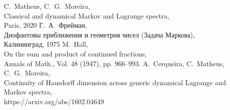 \begin{thebibliography}{3}
	C.~Matheus, C.~G.~Moreira,\\
	Classical and dynamical Markov and Lagrange spectra,\\
	Paris, 2020
	Г.~А.~Фрейман,\\
	Диофантовы приближения и геометрия чисел (Задача Маркова),\\
	Калининград, 1975
	M.~Hall,\\
	On the sum and product of continued fractions,\\
	Annals of Math., Vol. 48 (1947), pp. 966–993.
	A.~Cerqueira, C.~Matheus, C.~G.~Moreira,\\
	Continuity of Hausdorff dimension across
	generic dynamical Lagrange and Markov spectra,\\
	https://arxiv.org/abs/1602.04649
\end{thebibliography}
